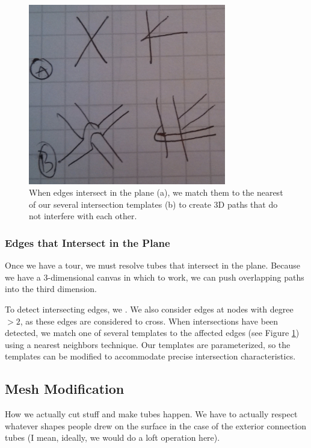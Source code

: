 \begin{figure}[h!]
\centering
    \includegraphics[width=3.4in]{figures/placeholder/templates.jpg}
\caption{When edges intersect in the plane (a), we match them to the nearest of our several intersection templates (b) to create 3D paths that do not interfere with each other.}
\label{fig:templates}
\end{figure}

\subsubsection{Edges that Intersect in the Plane}
Once we have a tour, we must resolve tubes that intersect in the plane.  Because we have a 3-dimensional canvas in which to work, we can push overlapping paths into the third dimension.

To detect intersecting edges, we .  We also consider edges at nodes with degree $>2$, as these edges are considered to cross.  When intersections have been detected, we match one of several templates to the affected edges (see Figure \ref{fig:templates}) using a nearest neighbors technique.  Our templates are parameterized, so the templates can be modified to accommodate precise intersection characteristics.

\subsection{Mesh Modification}

How we actually cut stuff and make tubes happen.   We have to actually respect whatever shapes people drew on the surface in the case of the exterior connection tubes (I mean, ideally, we would do a loft operation here).


